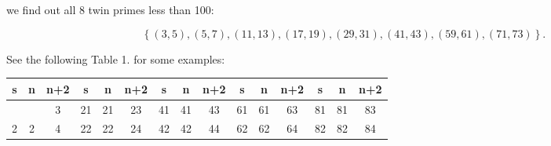 \documentclass{aomart}
\begin{document}
we find out all 8 twin primes less than 100:

\begin{equation}
\left\{\left(3, 5\right),\left(5, 7\right),\left(11, 13\right),\left(17, 19\right),\left(29, 31\right),\left(41, 43\right),\left(59, 61\right),\left(71, 73\right)\right\} .
\end{equation}

\vspace{1\baselineskip}

See the following Table 1. for some examples:


\begin{table}[H]
\centering
\begin{adjustbox}{max width=\textwidth}
\begin{tabular}{|c|c|c!{\vrule width 1.5pt}c|c|c!{\vrule width 2pt}c|c|c!{\vrule width 1.5pt}c|c|c!{\vrule width 1.5pt}c|c|c|}
\hline
s & n & n+2 & s & n & n+2 & s & n & n+2 & s & n & n+2 & s & n & n+2 \\ \hline

  &   & 3 &  21 &  21 & 23 & 41 & 41 & 43 &  61 & 61 &  63 &  81 &  81 & 83 \\ \hline
{} 2 & 2 &  4 &  22 &  22 &  24 &  42 &  42 &  44 &  62 &  62 &  64 &  82 &  82 &  84 \\ \hline



\end{tabular}
\end{adjustbox}
\end{table}
\end{document}
